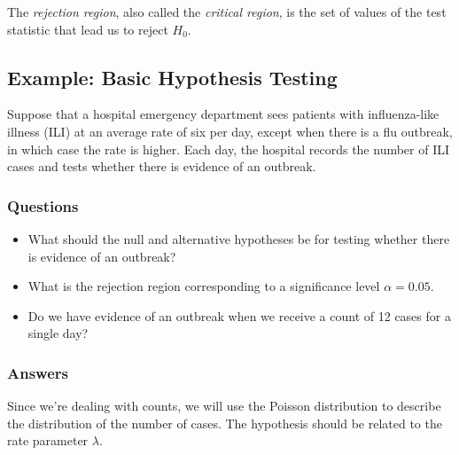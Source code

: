 \documentclass[
  letterpaper,
  DIV=11,
  numbers=noendperiod]{scrartcl}
\providecommand{\tightlist}{%
  \setlength{\itemsep}{0pt}\setlength{\parskip}{0pt}}
\begin{document}
\begin{tcolorbox}[enhanced jigsaw, bottomtitle=1mm, colback=white, opacityback=0, leftrule=.75mm, opacitybacktitle=0.6, coltitle=black, left=2mm, colframe=quarto-callout-note-color-frame, toptitle=1mm, colbacktitle=quarto-callout-note-color!10!white, titlerule=0mm, title=\textcolor{quarto-callout-note-color}{\faInfo}\hspace{0.5em}{Rejection Region}, arc=.35mm, rightrule=.15mm, breakable, bottomrule=.15mm, toprule=.15mm]

The \emph{rejection region}, also called the \emph{critical region}, is
the set of values of the test statistic that lead us to reject \(H_0\).

\end{tcolorbox}

\subsection{Example: Basic Hypothesis
Testing}\label{example-basic-hypothesis-testing}

Suppose that a hospital emergency department sees patients with
influenza-like illness (ILI) at an average rate of six per day, except
when there is a flu outbreak, in which case the rate is higher. Each
day, the hospital records the number of ILI cases and tests whether
there is evidence of an outbreak.

\subsubsection{Questions}

\begin{itemize}
\tightlist
\item
  What should the null and alternative hypotheses be for testing whether
  there is evidence of an outbreak?
\item
  What is the rejection region corresponding to a significance level
  \(\alpha=0.05\).
\item
  Do we have evidence of an outbreak when we receive a count of 12 cases
  for a single day?
\end{itemize}

\subsubsection{Answers}

Since we're dealing with counts, we will use the Poisson distribution to
describe the distribution of the number of cases. The hypothesis should
be related to the rate parameter \(\lambda\).
\end{document}
